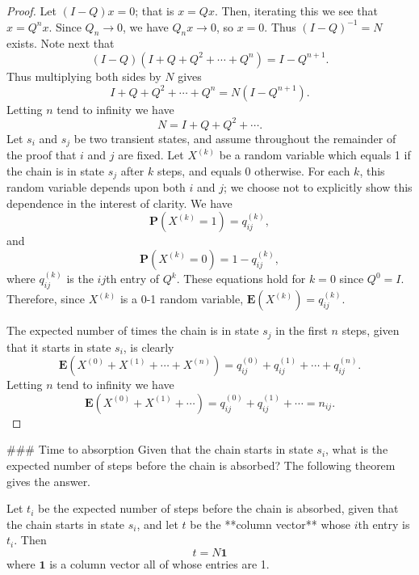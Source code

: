 \begin{proof}
Let $(I-Q)x = 0$; that is $x = Qx$. Then, iterating this we see that $x = Q^n x$. Since $Q_n \to 0$, we have $Q_n x \to 0$, so $x = 0$. Thus $(I-Q)^{-1} = N$
exists. Note next that
\begin{equation*}
    (I-Q)(I+Q + Q^2 + \cdots + Q^n) = I - Q^{n+1}.
\end{equation*}
Thus multiplying both sides by $N$ gives
\begin{equation*}
    I + Q + Q^2 + \cdots + Q^n = N(I-Q^{n+1}) .
\end{equation*}
Letting $n$ tend to infinity we have
\begin{equation*}
    N = I + Q + Q^2 + \cdots .
\end{equation*}
Let $s_i$ and $s_j$ be two transient states, and assume throughout the remainder of the proof that $i$ and $j$ are fixed. Let $X^{(k)}$ be a random variable which equals 1 if the chain is in state $s_j$ after $k$ steps, and equals 0 otherwise. For each $k$, this random variable depends upon both $i$ and $j$; we choose not to explicitly show this dependence in the interest of clarity. We have
\begin{equation*}
    \mathbf{P} \left(X^{(k)}=1\right)=q_{i j}^{(k)},
\end{equation*}
and 
\begin{equation*}
    \mathbf{P} \left(X^{(k)}=0\right)=1-q_{i j}^{(k)},
\end{equation*}
where $q_{i j}^{(k)}$ is the $ij$th entry of $Q^k$. These equations hold for $k = 0$ since $Q^0 = I$. Therefore, since $X^{(k)}$ is a 0-1 random variable, $\mathbf{E}(X^{(k)}) = q_{i j}^{(k)}$.

The expected number of times the chain is in state $s_j$ in the first $n$ steps, given that it starts in state $s_i$, is clearly
\begin{equation*}
    \mathbf{E}\left(X^{(0)}+X^{(1)}+\cdots+X^{(n)}\right)=q_{i j}^{(0)}+q_{i j}^{(1)}+\cdots+q_{i j}^{(n)}.
\end{equation*}
Letting $n$ tend to infinity we have
\begin{equation*}
    \mathbf{E}\left(X^{(0)}+X^{(1)}+\cdots\right)=q_{i j}^{(0)}+q_{i j}^{(1)}+\cdots=n_{i j}.
\end{equation*}
\end{proof}


### Time to absorption
Given that the chain starts in state $s_i$, what is the expected number of steps before the chain is absorbed? The following theorem gives the answer.
\begin{theorem}
Let $t_i$ be the expected number of steps before the chain is absorbed, given that the chain starts in state $s_i$, and let $t$ be the **column vector** whose $i$th entry is $t_i$. Then
\begin{equation*}
    t = N \mathbf{1}
\end{equation*}
where $\mathbf{1}$ is a column vector all of whose entries are 1.
\end{theorem}

